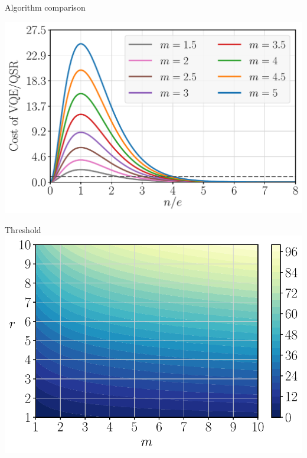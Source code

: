 \begin{frame}[allowframebreaks]{Algorithm comparison}
\begin{multicols}{2}
    \begin{center}
      \includegraphics[width=.40\paperwidth]{Figures/chapter05/VQE-vs-QSR_m}
    \end{center}

  \end{multicols}

\break

  \begin{multicols}{2}

    \begin{center}
      Threshold \\
      \includegraphics[width=.40\paperwidth]{Figures/chapter05/threshold}
    \end{center}


\end{multicols}
\end{frame}
